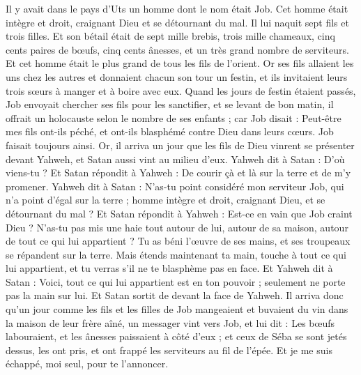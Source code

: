 \begin{multicols}{2}
\VerseOne{}Il y avait dans le pays d'Uts un homme dont le nom était Job. Cet homme était intègre et droit, craignant Dieu et se détournant du mal.
Il lui naquit sept fils et trois filles.
Et son bétail était de sept mille brebis, trois mille chameaux, cinq cents paires de bœufs, cinq cents ânesses, et un très grand nombre de serviteurs. Et cet homme était le plus grand de tous les fils de l'orient.
Or ses fils allaient les uns chez les autres et donnaient chacun son tour un festin, et ils invitaient leurs trois sœurs à manger et à boire avec eux.
Quand les jours de festin étaient passés, Job envoyait chercher ses fils pour les sanctifier, et se levant de bon matin, il offrait un holocauste selon le nombre de ses enfants ; car Job disait : Peut-être mes fils ont-ils péché, et ont-ils blasphémé contre Dieu dans leurs cœurs. Job faisait toujours ainsi.
Or, il arriva un jour que les fils de Dieu vinrent se présenter devant Yahweh, et Satan aussi vint au milieu d'eux.
Yahweh dit à Satan : D'où viens-tu ? Et Satan répondit à Yahweh : De courir çà et là sur la terre et de m'y promener.
Yahweh dit à Satan : N'as-tu point considéré mon serviteur Job, qui n'a point d'égal sur la terre ; homme intègre et droit, craignant Dieu, et se détournant du mal ?
Et Satan répondit à Yahweh : Est-ce en vain que Job craint Dieu ?
N'as-tu pas mis une haie  tout autour de lui, autour de sa maison, autour de tout ce qui lui appartient ? Tu as béni l'œuvre de ses mains, et ses troupeaux se répandent sur la terre.
Mais étends maintenant ta main, touche à tout ce qui lui appartient, et tu verras s'il ne te blasphème pas en face.
Et Yahweh dit à Satan : Voici, tout ce qui lui appartient est en ton pouvoir ; seulement ne porte pas la main sur lui. Et Satan sortit de devant la face de Yahweh.
Il arriva donc qu'un jour comme les fils et les filles de Job mangeaient et buvaient du vin dans la maison de leur frère aîné, un messager vint vers Job,
et lui dit : Les bœufs labouraient, et les ânesses paissaient à côté d'eux ;
et ceux de Séba se sont jetés dessus, les ont pris, et ont frappé les serviteurs au fil de l'épée. Et je me suis échappé, moi seul, pour te l'annoncer.

\end{multicols}
